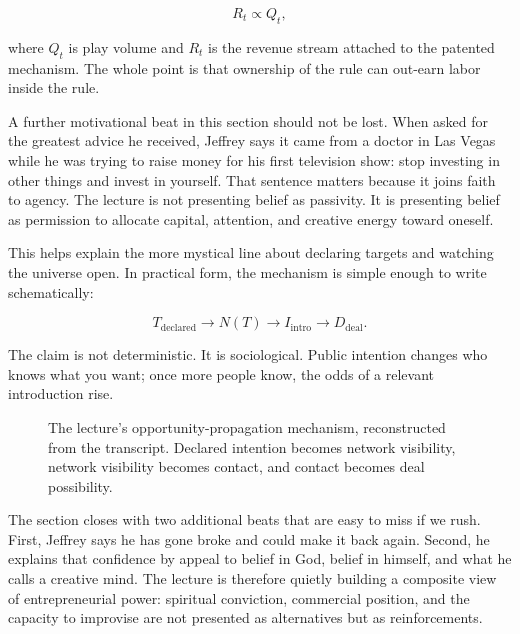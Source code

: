 \begin{equation}
R_t \propto Q_t,
\end{equation}

where \(Q_t\) is play volume and \(R_t\) is the revenue stream attached to the patented mechanism. The whole point is that ownership of the rule can out-earn labor inside the rule.

A further motivational beat in this section should not be lost. When asked for the greatest advice he received, Jeffrey says it came from a doctor in Las Vegas while he was trying to raise money for his first television show: stop investing in other things and invest in yourself. That sentence matters because it joins faith to agency. The lecture is not presenting belief as passivity. It is presenting belief as permission to allocate capital, attention, and creative energy toward oneself.

This helps explain the more mystical line about declaring targets and watching the universe open. In practical form, the mechanism is simple enough to write schematically:

\begin{equation}
T_{\mathrm{declared}} \to N(T) \to I_{\mathrm{intro}} \to D_{\mathrm{deal}}.
\end{equation}

The claim is not deterministic. It is sociological. Public intention changes who knows what you want; once more people know, the odds of a relevant introduction rise.

\begin{figure}[h]
\centering
{}
\caption{The lecture's opportunity-propagation mechanism, reconstructed from the transcript. Declared intention becomes network visibility, network visibility becomes contact, and contact becomes deal possibility.}
\end{figure}

The section closes with two additional beats that are easy to miss if we rush. First, Jeffrey says he has gone broke and could make it back again. Second, he explains that confidence by appeal to belief in God, belief in himself, and what he calls a creative mind. The lecture is therefore quietly building a composite view of entrepreneurial power: spiritual conviction, commercial position, and the capacity to improvise are not presented as alternatives but as reinforcements.

